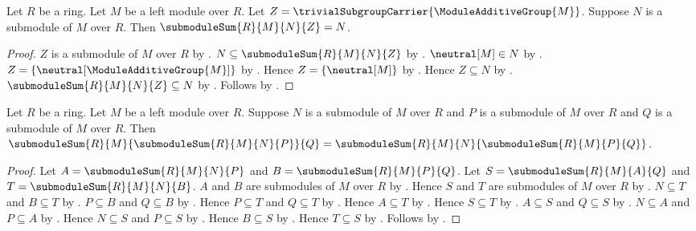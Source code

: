 \begin{theorem}\label{submodule_sum_zero}
    Let $R$ be a ring.
    Let $M$ be a left module over $R$.
    Let $Z=\trivialSubgroupCarrier{\ModuleAdditiveGroup{M}}$.
    Suppose $N$ is a submodule of $M$ over $R$.
    Then $\submoduleSum{R}{M}{N}{Z}=N$.
\end{theorem}
\begin{proof}
    $Z$ is a submodule of $M$ over $R$ by .
    $N\subseteq\submoduleSum{R}{M}{N}{Z}$ by
        .
    $\neutral[M]\in N$ by .
    $Z=\{\neutral[\ModuleAdditiveGroup{M}]\}$ by
        .
    Hence $Z=\{\neutral[M]\}$ by
        .
    Hence $Z\subseteq N$ by .
    $\submoduleSum{R}{M}{N}{Z}\subseteq N$ by
        .
    Follows by .
\end{proof}

\begin{theorem}\label{submodule_sum_associative}
    Let $R$ be a ring.
    Let $M$ be a left module over $R$.
    Suppose $N$ is a submodule of $M$ over $R$ and
        $P$ is a submodule of $M$ over $R$ and
        $Q$ is a submodule of $M$ over $R$.
    Then
        $\submoduleSum{R}{M}{\submoduleSum{R}{M}{N}{P}}{Q}
            =\submoduleSum{R}{M}{N}{\submoduleSum{R}{M}{P}{Q}}$.
\end{theorem}
\begin{proof}
    Let $A=\submoduleSum{R}{M}{N}{P}$ and
        $B=\submoduleSum{R}{M}{P}{Q}$.
    Let $S=\submoduleSum{R}{M}{A}{Q}$ and
        $T=\submoduleSum{R}{M}{N}{B}$.
    $A$ and $B$ are submodules of $M$ over $R$ by
        .
    Hence $S$ and $T$ are submodules of $M$ over $R$ by
        .
    $N\subseteq T$ and $B\subseteq T$ by
        .
    $P\subseteq B$ and $Q\subseteq B$ by
        .
    Hence $P\subseteq T$ and $Q\subseteq T$ by
        .
    Hence $A\subseteq T$ by .
    Hence $S\subseteq T$ by .
    $A\subseteq S$ and $Q\subseteq S$ by
        .
    $N\subseteq A$ and $P\subseteq A$ by
        .
    Hence $N\subseteq S$ and $P\subseteq S$ by
        .
    Hence $B\subseteq S$ by .
    Hence $T\subseteq S$ by .
    Follows by .
\end{proof}

